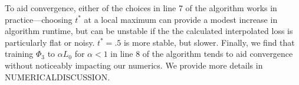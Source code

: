   To aid convergence, either of the choices in line $7$ of the algorithm works in practice---choosing $t^*$ at a local maximum can provide a modest increase in algorithm runtime, but can be unstable if the the calculated interpolated loss is particularly flat or noisy.  $t^*=.5$ is more stable, but slower.  Finally, we find that training $\Phi_3$ to $\alpha L_0$ for $\alpha < 1$ in line $8$ of the algorithm tends to aid convergence without noticeably impacting our numerics.  We provide more details in NUMERICALDISCUSSION.
 
